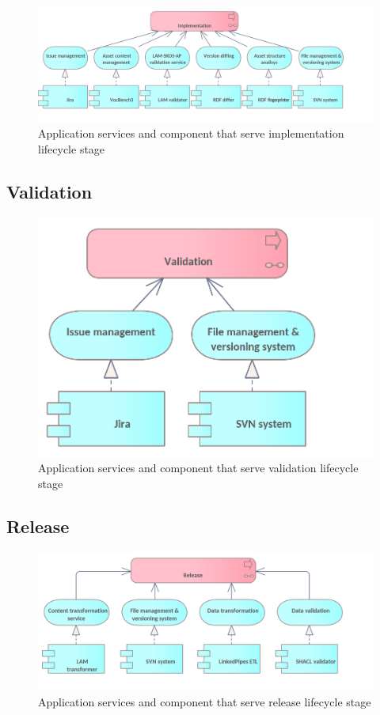     \begin{figure}[!h]
		\centering
		\includegraphics[width=.95\textwidth]{images/application/lifecycle/Implementation.png}
		\caption{Application services and component that serve implementation lifecycle stage}
		\label{fig:app-implementation}
	\end{figure}

	\subsection{Validation}

	 \begin{figure}[!h]
		\centering
		\includegraphics[width=.5\textwidth]{images/application/lifecycle/Validation.png}
		\caption{Application services and component that serve validation lifecycle stage}
		\label{fig:app-validation}
	\end{figure}	
	
	\subsection{Release}
	
	 \begin{figure}[!h]
		\centering
		\includegraphics[width=.8\textwidth]{images/application/lifecycle/Release.png}
		\caption{Application services and component that serve release lifecycle stage}
		\label{fig:app-release}
	\end{figure}
	
